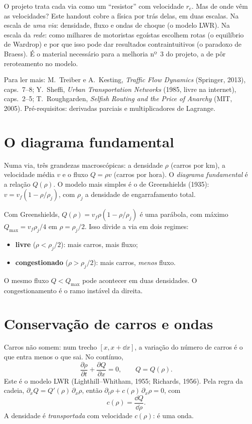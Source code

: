 \documentclass[11pt]{article}
\begin{document}
\fazertitulo

O projeto trata cada via como um ``resistor'' com velocidade $r_e$. Mas de onde vêm as velocidades? Este handout cobre a física por trás delas, em duas escalas. Na escala de \emph{uma via}: densidade, fluxo e ondas de choque (o modelo LWR). Na escala da \emph{rede}: como milhares de motoristas egoístas escolhem rotas (o equilíbrio de Wardrop) e por que isso pode dar resultados contraintuitivos (o paradoxo de Braess). É o material necessário para a melhoria nº~3 do projeto, a de pôr reroteamento no modelo.

Para ler mais: M.~Treiber e A.~Kesting, \emph{Traffic Flow Dynamics} (Springer, 2013), caps.\ 7--8; Y.~Sheffi, \emph{Urban Transportation Networks} (1985, livre na internet), caps.\ 2--5; T.~Roughgarden, \emph{Selfish Routing and the Price of Anarchy} (MIT, 2005). Pré-requisitos: derivadas parciais e multiplicadores de Lagrange. 

\section{O diagrama fundamental}

Numa via, três grandezas macroscópicas: a densidade $\rho$ (carros por km), a velocidade média $v$ e o fluxo $Q = \rho v$ (carros por hora). O \emph{diagrama fundamental} é a relação $Q(\rho)$. O modelo mais simples é o de Greenshields (1935): $v = v_f(1-\rho/\rho_j)$, com $\rho_j$ a densidade de engarrafamento total.

\begin{ideia}
Com Greenshields, $Q(\rho) = v_f\rho(1-\rho/\rho_j)$ é uma parábola, com máximo $Q_{\max} = v_f\rho_j/4$ em $\rho = \rho_j/2$. Isso divide a via em dois regimes:
\begin{itemize}
  \item \textbf{livre} ($\rho<\rho_j/2$): mais carros, mais fluxo;
  \item \textbf{congestionado} ($\rho>\rho_j/2$): mais carros, \emph{menos} fluxo.
\end{itemize}
O mesmo fluxo $Q<Q_{\max}$ pode acontecer em duas densidades. O congestionamento é o ramo instável da direita.
\end{ideia}

\section{Conservação de carros e ondas}

Carros não somem: num trecho $[x, x+\dd x]$, a variação do número de carros é o que entra menos o que sai. No contínuo,
\[
\frac{\partial\rho}{\partial t}+\frac{\partial Q}{\partial x} = 0,\qquad Q = Q(\rho).
\]
Este é o modelo LWR (Lighthill--Whitham, 1955; Richards, 1956). Pela regra da cadeia, $\partial_xQ = Q'(\rho)\,\partial_x\rho$, então $\partial_t\rho + c(\rho)\,\partial_x\rho = 0$, com
\[
c(\rho) = \frac{\dd Q}{\dd\rho}.
\]
A densidade é \emph{transportada} com velocidade $c(\rho)$: é uma onda.
\end{document}
